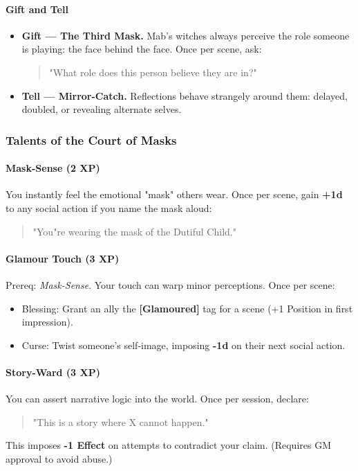 \documentclass[11pt]{book}
\begin{document}
\paragraph{Gift and Tell}
\begin{itemize}[leftmargin=*]
    \item \textbf{Gift --- The Third Mask.} Mab's witches always perceive the role someone is playing: the face behind the face. Once per scene, ask:
    \begin{quote}
        "What role does this person believe they are in?"
    \end{quote}
    \item \textbf{Tell --- Mirror-Catch.} Reflections behave strangely around them: delayed, doubled, or revealing alternate selves.
\end{itemize}

\subsubsection{Talents of the Court of Masks}

\paragraph{Mask-Sense (2 XP)}
You instantly feel the emotional "mask" others wear.  
Once per scene, gain \textbf{+1d} to any social action if you name the mask aloud:
\begin{quote}
    "You"re wearing the mask of the Dutiful Child."
\end{quote}

\paragraph{Glamour Touch (3 XP)}
Prereq: \emph{Mask-Sense}.  
Your touch can warp minor perceptions.  
Once per scene:
\begin{itemize}[leftmargin=*]
    \item Blessing: Grant an ally the \textbf{[Glamoured]} tag for a scene (+1 Position in first impression).
    \item Curse: Twist someone's self-image, imposing \textbf{-1d} on their next social action.
\end{itemize}

\paragraph{Story-Ward (3 XP)}
You can assert narrative logic into the world.  
Once per session, declare:
\begin{quote}
    "This is a story where X cannot happen."
\end{quote}
This imposes \textbf{-1 Effect} on attempts to contradict your claim.  
(Requires GM approval to avoid abuse.)
\end{document}
